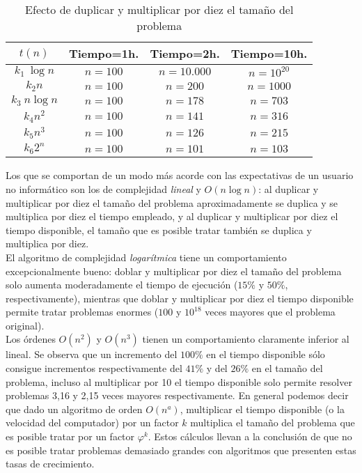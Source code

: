 \begin{table}[H]
\begin{center}
\begin{tabular}{|c|c|c|c|}
\hline
$t(n)$ & Tiempo=1h. & Tiempo=2h. & Tiempo=10h. \\
\hline
$k_1\ \log n$ & $n=100$  & $n=10.000$ & $n=10^{20}$ \\
\hline
$k_2 n$ & $n=100$  & $n=200$ & $n=1000$ \\
\hline
$k_3\ n \log n$ & $n=100$ & $n=178$ & $n=703$ \\
\hline
$k_4 n^2$ & $n=100$ & $n=141$ & $n=316$ \\
\hline
$k_5 n^3$ & $n=100$ & $n=126$ & $n=215$ \\
\hline
$k_6 2^n$ & $n=100$ & $n=101$ & $n=103$ \\
\hline
\end{tabular}
\caption{Efecto de duplicar y multiplicar por diez el tamaño del problema}
\end{center}
\end{table}

Los que se comportan de un modo más acorde con las expectativas de un usuario no informático son los de complejidad \emph{lineal} y $O(n \log n)$: al duplicar y multiplicar por diez el tamaño del problema aproximadamente se duplica y se multiplica por diez el tiempo empleado, y al duplicar y multiplicar por diez el tiempo disponible, el tamaño que es posible tratar también se duplica y multiplica por diez.\\

El algoritmo de complejidad \emph{logarítmica} tiene un comportamiento excepcionalmente bueno: doblar y multiplicar por diez el tamaño del problema solo aumenta moderadamente el tiempo de ejecución ($15\%$ y $50\%$, respectivamente), mientras que doblar y multiplicar por diez el tiempo disponible permite tratar problemas enormes ($100$ y $10^{18}$ veces mayores que el problema original).\\

Los órdenes $O(n^2)$ y $O(n^3)$ tienen un comportamiento claramente inferior al lineal. Se observa que un incremento del $100\%$ en el tiempo disponible sólo consigue incrementos respectivamente del $41\%$ y del $26\%$ en el tamaño del problema, incluso al multiplicar por 10 el tiempo disponible solo permite resolver problemas 3,16 y 2,15 veces mayores respectivamente. En general podemos decir que dado un algoritmo de orden $O(n^a)$, multiplicar el tiempo disponible (o la velocidad del computador) por un factor $k$ multiplica el tamaño del problema que es posible tratar por un factor $\varphi^k$. Estos cálculos llevan a la conclusión de que no es posible tratar problemas demasiado grandes con algoritmos que presenten estas tasas de crecimiento.\\

